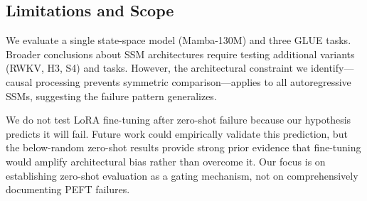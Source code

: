 \subsection{Limitations and Scope}

We evaluate a single state-space model (Mamba-130M) and three GLUE tasks. Broader conclusions about SSM architectures require testing additional variants (RWKV, H3, S4) and tasks. However, the architectural constraint we identify---causal processing prevents symmetric comparison---applies to all autoregressive SSMs, suggesting the failure pattern generalizes.

We do not test LoRA fine-tuning after zero-shot failure because our hypothesis predicts it will fail. Future work could empirically validate this prediction, but the below-random zero-shot results provide strong prior evidence that fine-tuning would amplify architectural bias rather than overcome it. Our focus is on establishing zero-shot evaluation as a gating mechanism, not on comprehensively documenting PEFT failures.
